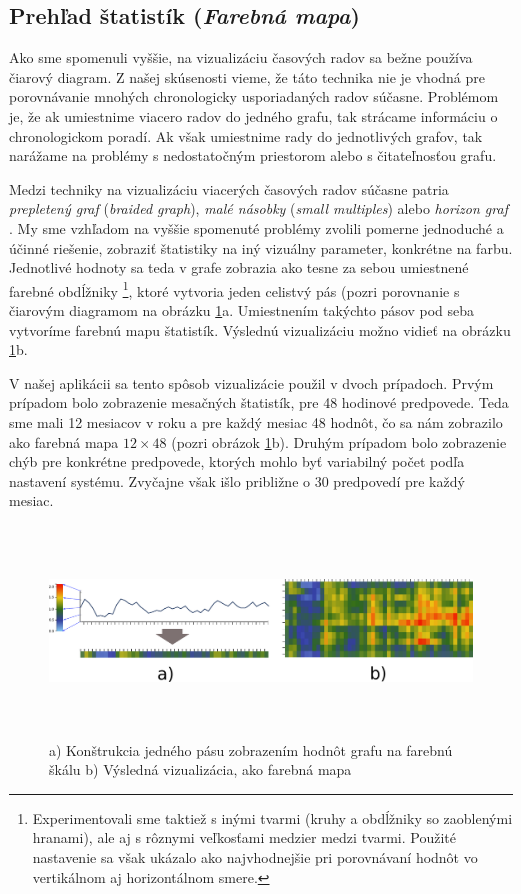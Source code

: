 \subsection{Prehľad štatistík {\small(\textit{Farebná mapa})}}
\label{sec:colormap}
Ako sme spomenuli vyššie, na vizualizáciu časových radov sa bežne používa čiarový diagram. Z našej skúsenosti vieme, že táto technika nie je vhodná pre porovnávanie mnohých chronologicky usporiadaných radov súčasne. Problémom je, že ak umiestnime viacero radov do jedného grafu, tak strácame informáciu o chronologickom poradí. Ak však umiestnime rady do jednotlivých grafov, tak narážame na problémy s nedostatočným priestorom alebo s čitateľnosťou grafu. 

Medzi techniky na vizualizáciu viacerých časových radov súčasne patria \textit{prepletený graf} (\textit{braided graph}), \textit{malé násobky} (\textit{small multiples}) alebo \textit{horizon graf} \cite{MultipleTimeSeries}. My sme vzhľadom na vyššie spomenuté problémy zvolili pomerne jednoduché a účinné riešenie, zobraziť štatistiky na iný vizuálny parameter, konkrétne na farbu. Jednotlivé hodnoty sa teda v grafe zobrazia ako tesne za sebou umiestnené farebné obdĺžniky \footnote{Experimentovali sme taktiež s inými tvarmi (kruhy a obdĺžniky so zaoblenými hranami), ale aj s rôznymi veľkosťami medzier medzi tvarmi. Použité nastavenie sa však ukázalo ako najvhodnejšie pri porovnávaní hodnôt vo vertikálnom aj horizontálnom smere.}, ktoré vytvoria jeden celistvý pás (pozri porovnanie s čiarovým diagramom na obrázku \ref{fig:colormap}a. Umiestnením takýchto pásov pod seba vytvoríme farebnú mapu štatistík. Výslednú vizualizáciu možno vidieť na obrázku \ref{fig:colormap}b. 

V našej aplikácii sa tento spôsob vizualizácie použil v dvoch prípadoch. Prvým prípadom bolo zobrazenie mesačných štatistík, pre 48 hodinové predpovede. Teda sme mali 12 mesiacov v roku a pre každý mesiac 48 hodnôt, čo sa nám zobrazilo ako farebná mapa $ 12 \times 48 $ (pozri obrázok \ref{fig:colormap}b). Druhým prípadom bolo zobrazenie chýb pre konkrétne predpovede, ktorých mohlo byť variabilný počet podľa nastavení systému. Zvyčajne však išlo približne o 30 predpovedí pre každý mesiac.

\begin{figure}
	\centering
	\hspace*{-0.45in}
	\includegraphics[width = 7.0in, height = 2.2in]{colormap}
	\caption{a) Konštrukcia jedného pásu zobrazením hodnôt grafu na farebnú škálu b) Výsledná vizualizácia, ako farebná mapa }
	\label{fig:colormap}
\end{figure}


